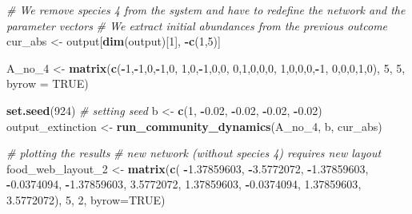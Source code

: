 \documentclass[
]{article}
\newenvironment{Shaded}{\begin{snugshade}}{\end{snugshade}}
\newcommand{\AttributeTok}[1]{\textcolor[rgb]{0.13,0.29,0.53}{#1}}
\newcommand{\CommentTok}[1]{\textcolor[rgb]{0.56,0.35,0.01}{\textit{#1}}}
\newcommand{\ConstantTok}[1]{\textcolor[rgb]{0.56,0.35,0.01}{#1}}
\newcommand{\DecValTok}[1]{\textcolor[rgb]{0.00,0.00,0.81}{#1}}
\newcommand{\FloatTok}[1]{\textcolor[rgb]{0.00,0.00,0.81}{#1}}
\newcommand{\FunctionTok}[1]{\textcolor[rgb]{0.13,0.29,0.53}{\textbf{#1}}}
\newcommand{\NormalTok}[1]{#1}
\newcommand{\OtherTok}[1]{\textcolor[rgb]{0.56,0.35,0.01}{#1}}
\newcommand{\SpecialCharTok}[1]{\textcolor[rgb]{0.81,0.36,0.00}{\textbf{#1}}}
\begin{document}
\begin{Shaded}
\begin{Highlighting}[]
\CommentTok{\# We remove species 4 from the system and have to redefine the network and the parameter vectors}
\CommentTok{\# We extract initial abundances from the previous outcome}
\NormalTok{cur\_abs }\OtherTok{\textless{}{-}}\NormalTok{ output[}\FunctionTok{dim}\NormalTok{(output)[}\DecValTok{1}\NormalTok{], }\SpecialCharTok{{-}}\FunctionTok{c}\NormalTok{(}\DecValTok{1}\NormalTok{,}\DecValTok{5}\NormalTok{)]}

\NormalTok{A\_no\_4 }\OtherTok{\textless{}{-}} \FunctionTok{matrix}\NormalTok{(}\FunctionTok{c}\NormalTok{(}\SpecialCharTok{{-}}\DecValTok{1}\NormalTok{,}\SpecialCharTok{{-}}\DecValTok{1}\NormalTok{,}\DecValTok{0}\NormalTok{,}\SpecialCharTok{{-}}\DecValTok{1}\NormalTok{,}\DecValTok{0}\NormalTok{,}
                   \DecValTok{1}\NormalTok{,}\DecValTok{0}\NormalTok{,}\SpecialCharTok{{-}}\DecValTok{1}\NormalTok{,}\DecValTok{0}\NormalTok{,}\DecValTok{0}\NormalTok{,}
                   \DecValTok{0}\NormalTok{,}\DecValTok{1}\NormalTok{,}\DecValTok{0}\NormalTok{,}\DecValTok{0}\NormalTok{,}\DecValTok{0}\NormalTok{,}
                   \DecValTok{1}\NormalTok{,}\DecValTok{0}\NormalTok{,}\DecValTok{0}\NormalTok{,}\DecValTok{0}\NormalTok{,}\SpecialCharTok{{-}}\DecValTok{1}\NormalTok{,}
                   \DecValTok{0}\NormalTok{,}\DecValTok{0}\NormalTok{,}\DecValTok{0}\NormalTok{,}\DecValTok{1}\NormalTok{,}\DecValTok{0}\NormalTok{), }\DecValTok{5}\NormalTok{, }\DecValTok{5}\NormalTok{, }\AttributeTok{byrow =} \ConstantTok{TRUE}\NormalTok{)}


\FunctionTok{set.seed}\NormalTok{(}\DecValTok{924}\NormalTok{)               }\CommentTok{\# setting seed}
\NormalTok{b }\OtherTok{\textless{}{-}} \FunctionTok{c}\NormalTok{(}\DecValTok{1}\NormalTok{, }\SpecialCharTok{{-}}\FloatTok{0.02}\NormalTok{, }\SpecialCharTok{{-}}\FloatTok{0.02}\NormalTok{, }\SpecialCharTok{{-}}\FloatTok{0.02}\NormalTok{, }\SpecialCharTok{{-}}\FloatTok{0.02}\NormalTok{)}
\NormalTok{output\_extinction }\OtherTok{\textless{}{-}} \FunctionTok{run\_community\_dynamics}\NormalTok{(A\_no\_4, b, cur\_abs)}

\CommentTok{\# plotting the results}
\CommentTok{\# new network (without species 4) requires new layout}
\NormalTok{food\_web\_layout\_2 }\OtherTok{\textless{}{-}} \FunctionTok{matrix}\NormalTok{(}\FunctionTok{c}\NormalTok{( }\SpecialCharTok{{-}}\FloatTok{1.37859603}\NormalTok{, }\SpecialCharTok{{-}}\FloatTok{3.5772072}\NormalTok{,}
                               \SpecialCharTok{{-}}\FloatTok{1.37859603}\NormalTok{, }\SpecialCharTok{{-}}\FloatTok{0.0374094}\NormalTok{,}
                               \SpecialCharTok{{-}}\FloatTok{1.37859603}\NormalTok{,  }\FloatTok{3.5772072}\NormalTok{,}
                               \FloatTok{1.37859603}\NormalTok{, }\SpecialCharTok{{-}}\FloatTok{0.0374094}\NormalTok{,}
                               \FloatTok{1.37859603}\NormalTok{,   }\FloatTok{3.5772072}\NormalTok{), }\DecValTok{5}\NormalTok{, }\DecValTok{2}\NormalTok{, }\AttributeTok{byrow=}\ConstantTok{TRUE}\NormalTok{)}


\end{Highlighting}
\end{Shaded}
\end{document}
